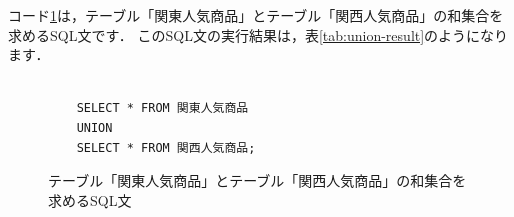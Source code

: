 コード\ref{code:sql-union}は，テーブル「関東人気商品」とテーブル「関西人気商品」の和集合を求めるSQL文です．
このSQL文の実行結果は，表\ref{tab:union-result}のようになります．
\begin{figure}[!htbp]
    \begin{verbatim}

    SELECT * FROM 関東人気商品
    UNION
    SELECT * FROM 関西人気商品;

    \end{verbatim}
    \captionsetup{name=コード}
    \caption{テーブル「関東人気商品」とテーブル「関西人気商品」の和集合を求めるSQL文}
    \label{code:sql-union}
\end{figure}
\begin{table}[!htbp]
    \centering
    \caption{テーブル「関東人気商品」とテーブル「関西人気商品」同士の和集合演算（SQL）の結果}
    \label{tab:union-result}
\end{table}

